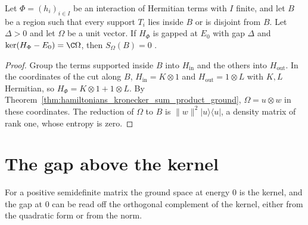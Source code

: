 \begin{theorem}
    \label{thm:hamiltonians_zero_entropy_cut}
    \leanok
    Let $\Phi=(h_i)_{i\in I}$ be an interaction of Hermitian terms with $I$ finite,
    and let $B$ be a region such that every support $T_i$ lies inside $B$ or is
    disjoint from $B$. Let $\Delta>0$ and let $\Omega$ be a unit vector. If
    $H_\Phi$ is gapped at $E_0$ with gap $\Delta$ and
    $\ker(H_\Phi-E_0)=\C\Omega$, then $S_\Omega(B)=0$
    \cite[Lemma~2.2]{OpenAI2026AreaLaw}.
\end{theorem}
\begin{proof}\leanok
    Group the terms supported inside $B$ into $H_{\mathrm{in}}$ and the others into
    $H_{\mathrm{out}}$. In the coordinates of the cut along $B$,
    $H_{\mathrm{in}}=K\otimes1$ and $H_{\mathrm{out}}=1\otimes L$ with $K,L$
    Hermitian, so $H_\Phi=K\otimes1+1\otimes L$. By
    Theorem~\ref{thm:hamiltonians_kronecker_sum_product_ground},
    $\Omega=u\otimes w$ in these coordinates. The reduction of $\Omega$ to $B$ is
    $\lVert w\rVert^2\lvert u\rangle\langle u\rvert$, a density matrix of rank one,
    whose entropy is zero.
\end{proof}

\section{The gap above the kernel}
\label{sec:hamiltonians_kernel_gap}

For a positive semidefinite matrix the ground space at energy $0$ is the
kernel, and the gap at $0$ can be read off the orthogonal complement of the
kernel, either from the quadratic form or from the norm.

